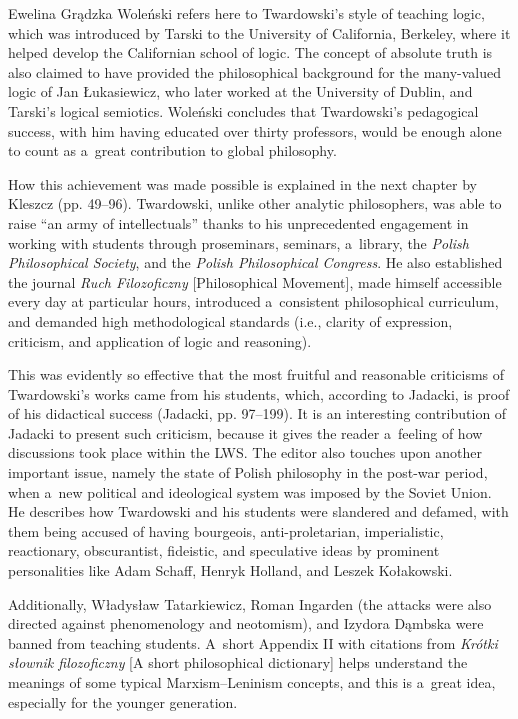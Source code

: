 \begin{newrevengenv}{Ewelina Grądzka}
Woleński refers here to Twardowski's style of teaching logic, which was introduced by Tarski to the University of California, Berkeley, where it helped develop the Californian school of logic. The concept of absolute truth is also claimed to have provided the philosophical background for the many-valued logic of Jan Łukasiewicz, who later worked at the University of Dublin, and Tarski's logical semiotics. Woleński concludes that Twardowski's pedagogical success, with him having educated over thirty professors, would be enough alone to count as a~great contribution to global philosophy.

How this achievement was made possible is explained in the next chapter by Kleszcz (pp. 49–96). Twardowski, unlike other analytic philosophers, was able to raise ``an army of intellectuals'' thanks to his unprecedented engagement in working with students through proseminars, seminars, a~library, the \textit{Polish Philosophical Society}, and the \textit{Polish Philosophical Congress}. He also established the journal \textit{Ruch Filozoficzny} [Philosophical Movement], made himself accessible every day at particular hours, introduced a~consistent philosophical curriculum, and demanded high methodological standards (i.e., clarity of expression, criticism, and application of logic and reasoning).

This was evidently so effective that the most fruitful and reasonable criticisms of Twardowski's works came from his students, which, according to Jadacki, is proof of his didactical success (Jadacki, pp. 97–199). It is an interesting contribution of Jadacki to present such criticism, because it gives the reader a~feeling of how discussions took place within the LWS. The editor also touches upon another important issue, namely the state of Polish philosophy in the post-war period, when a~new political and ideological system was imposed by the Soviet Union. He describes how Twardowski and his students were slandered and defamed, with them being accused of having bourgeois, anti-proletarian, imperialistic, reactionary, obscurantist, fideistic, and speculative ideas by prominent personalities like Adam Schaff, Henryk Holland, and Leszek Kołakowski.

Additionally, Władysław Tatarkiewicz, Roman Ingarden (the attacks were also directed against phenomenology and neotomism), and Izydora Dąmbska were banned from teaching students. A~short Appendix II with citations from \textit{Krótki słownik filozoficzny} [A short philosophical dictionary] helps understand the meanings of some typical Marxism–Leninism concepts, and this is a~great idea, especially for the younger generation.


\end{newrevengenv}
